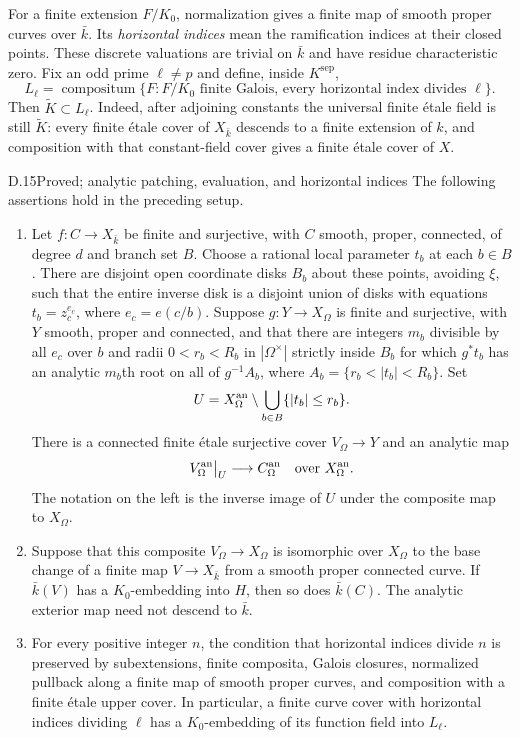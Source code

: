For a finite extension $F/K_0$, normalization gives a finite map of
smooth proper curves over $\bar k$. Its \emph{horizontal indices}
mean the ramification indices at their closed points. These discrete
valuations are trivial on $\bar k$ and have residue characteristic
zero. Fix an odd prime $\ell\ne p$ and define, inside
$K^{\mathrm{sep}}$,
\[
 L_\ell=\operatorname{compositum}\{F: F/K_0\text{ finite Galois,
                       every horizontal index divides }\ell\}.
\]
Then $\widetilde K\subset L_\ell$. Indeed, after adjoining constants
the universal finite \'etale field is still $\widetilde K$: every
finite \'etale cover of $X_{\bar k}$ descends to a finite extension
of $k$, and composition with that constant-field cover gives a finite
\'etale cover of $X$.

\begin{claim}{D.15}{Proved; analytic patching, evaluation, and horizontal indices}
\label{clm:D15}
The following assertions hold in the preceding setup.
\begin{enumerate}[label=(\roman*)]
\item Let $f:C\to X_{\bar k}$ be finite and surjective, with $C$
smooth, proper, connected, of degree $d$ and branch set $B$.
Choose a rational local parameter $t_b$ at each $b\in B$.
There are disjoint open coordinate disks $B_b$ about these points,
avoiding $\xi$, such that the entire inverse disk is a disjoint
union of disks with equations $t_b=z_c^{e_c}$, where
$e_c=e(c/b)$. Suppose $g:Y\to X_\Omega$ is finite and surjective,
with $Y$ smooth, proper and connected, and that there are integers
$m_b$ divisible by all $e_c$ over $b$ and radii
$0<r_b<R_b$ in $|\Omega^\times|$ strictly inside $B_b$ for which
$g^*t_b$ has an analytic $m_b$th root on all of
$g^{-1}A_b$, where $A_b=\{r_b<|t_b|<R_b\}$.
Set
\[
 U=X_\Omega^{\rm an}\setminus
            \bigcup_{b\in B}\{|t_b|\le r_b\}.
\]
There is a connected finite \'etale surjective cover $V_\Omega\to Y$
and an analytic map
\[
     V_\Omega^{\rm an}\big|_U\longrightarrow C_\Omega^{\rm an}
                         \quad\hbox{over }X_\Omega^{\rm an}.
\]
The notation on the left is the inverse image of $U$ under the
composite map to $X_\Omega$.
\item Suppose that this composite $V_\Omega\to X_\Omega$ is
isomorphic over $X_\Omega$ to the base change of a finite map
$V\to X_{\bar k}$ from a smooth proper connected curve. If
$\bar k(V)$ has a $K_0$-embedding into $H$, then so does
$\bar k(C)$. The analytic exterior map need not descend to $\bar k$.
\item For every positive integer $n$, the condition that horizontal
indices divide $n$ is preserved by subextensions, finite composita,
Galois closures, normalized pullback along a finite map of smooth
proper curves, and composition with a finite \'etale upper cover.
In particular, a finite curve cover with horizontal indices dividing
$\ell$ has a $K_0$-embedding of its function field into $L_\ell$.
\end{enumerate}
\end{claim}
